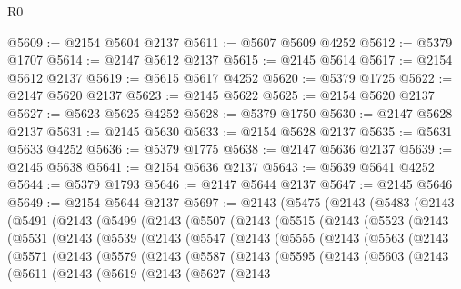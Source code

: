 \begin{lexlean}{R0}
\begin{coremodule}
@5609 := @2154 @5604 @2137
@5611 := @5607 @5609 @4252
@5612 := @5379 @1707
@5614 := @2147 @5612 @2137
@5615 := @2145 @5614
@5617 := @2154 @5612 @2137
@5619 := @5615 @5617 @4252
@5620 := @5379 @1725
@5622 := @2147 @5620 @2137
@5623 := @2145 @5622
@5625 := @2154 @5620 @2137
@5627 := @5623 @5625 @4252
@5628 := @5379 @1750
@5630 := @2147 @5628 @2137
@5631 := @2145 @5630
@5633 := @2154 @5628 @2137
@5635 := @5631 @5633 @4252
@5636 := @5379 @1775
@5638 := @2147 @5636 @2137
@5639 := @2145 @5638
@5641 := @2154 @5636 @2137
@5643 := @5639 @5641 @4252
@5644 := @5379 @1793
@5646 := @2147 @5644 @2137
@5647 := @2145 @5646
@5649 := @2154 @5644 @2137
@5697 := @2143
    (@5475
      (@2143
        (@5483
          (@2143
            (@5491
              (@2143
                (@5499
                  (@2143
                    (@5507
                      (@2143
                        (@5515
                          (@2143
                            (@5523
                              (@2143
                                (@5531
                                  (@2143
                                    (@5539
                                      (@2143
                                        (@5547
                                          (@2143
                                            (@5555
                                              (@2143
                                                (@5563
                                                  (@2143
                                                    (@5571
                                                      (@2143
                                                        (@5579
                                                          (@2143
                                                            (@5587
                                                              (@2143
                                                                (@5595
                                                                  (@2143
                                                                    (@5603
                                                                      (@2143
                                                                        (@5611
                                                                          (@2143
                                                                            (@5619
                                                                              (@2143
                                                                                (@5627
                                                                                  (@2143

\end{coremodule}
\end{lexlean}
